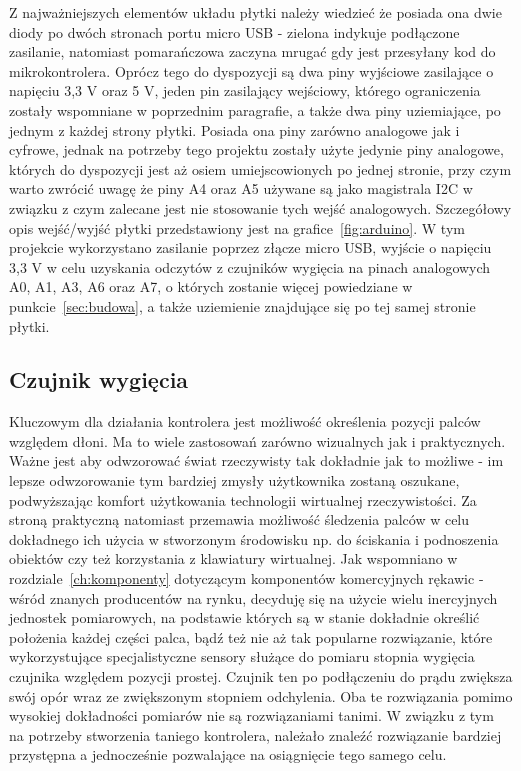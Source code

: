	Z najważniejszych elementów układu płytki należy wiedzieć że posiada ona dwie diody po dwóch stronach portu micro USB - zielona indykuje podłączone zasilanie, natomiast pomarańczowa zaczyna mrugać gdy jest przesyłany kod do mikrokontrolera. Oprócz tego do dyspozycji są dwa piny wyjściowe zasilające o napięciu 3,3 V oraz 5 V, jeden pin zasilający wejściowy, którego ograniczenia zostały wspomniane w poprzednim paragrafie, a także dwa piny uziemiające, po jednym z każdej strony płytki. Posiada ona piny zarówno analogowe jak i cyfrowe, jednak na potrzeby tego projektu zostały użyte jedynie piny analogowe, których do dyspozycji jest aż osiem umiejscowionych po jednej stronie, przy czym warto zwrócić uwagę że piny A4 oraz A5 używane są jako magistrala I2C w związku z czym zalecane jest nie stosowanie tych wejść analogowych. Szczegółowy opis wejść/wyjść płytki przedstawiony jest na grafice~\ref{fig:arduino}. W tym projekcie wykorzystano zasilanie poprzez złącze micro USB, wyjście o napięciu 3,3 V w celu uzyskania odczytów z czujników wygięcia na pinach analogowych A0, A1, A3, A6 oraz A7, o których zostanie więcej powiedziane w punkcie~\ref{sec:budowa}, a także uziemienie znajdujące się po tej samej stronie płytki.

	\subsection{Czujnik wygięcia}
	\label{subsec:wygiecie}	
	Kluczowym dla działania kontrolera jest możliwość określenia pozycji palców względem dłoni. Ma to wiele zastosowań zarówno wizualnych jak i praktycznych. Ważne jest aby odwzorować świat rzeczywisty tak dokładnie jak to możliwe - im lepsze odwzorowanie tym bardziej zmysły użytkownika zostaną oszukane, podwyższając komfort użytkowania technologii wirtualnej rzeczywistości. Za stroną praktyczną natomiast przemawia możliwość śledzenia palców w celu dokładnego ich użycia w stworzonym środowisku np. do ściskania i podnoszenia obiektów czy też korzystania z klawiatury wirtualnej. Jak wspomniano w rozdziale~\ref{ch:komponenty} dotyczącym komponentów komercyjnych rękawic - wśród znanych producentów na rynku, decyduję się na użycie wielu inercyjnych jednostek pomiarowych, na podstawie których są w stanie dokładnie określić położenia każdej części palca, bądź też nie aż tak popularne rozwiązanie, które wykorzystujące specjalistyczne sensory służące do pomiaru stopnia wygięcia czujnika względem pozycji prostej.
Czujnik ten po podłączeniu do prądu zwiększa swój opór wraz ze zwiększonym stopniem odchylenia. Oba te rozwiązania pomimo wysokiej dokładności pomiarów nie są rozwiązaniami tanimi. W związku z tym na potrzeby stworzenia taniego kontrolera, należało znaleźć rozwiązanie bardziej przystępna a jednocześnie pozwalające na osiągnięcie tego samego celu.
	
